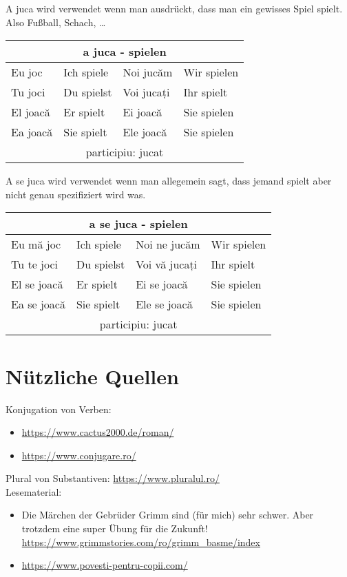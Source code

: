 \documentclass[11pt, oneside]{article}
\begin{document}
%
A juca wird verwendet wenn man ausdrückt, dass man ein gewisses Spiel spielt. Also Fußball, Schach, \dots
{}
\begin{center}
  \begin{tabular}{ |p{3.25cm}|p{3.25cm}||p{3.25cm}|p{3.25cm}| }
      \hline
      \multicolumn{4}{|c|}{a juca - spielen} \\
      \hline
      \hline
      Eu joc & Ich spiele & Noi jucăm & Wir spielen\\
      \hline
      Tu joci & Du spielst & Voi jucați & Ihr spielt\\
      \hline
      El joacă & Er spielt & Ei joacă & Sie spielen\\ 
      Ea joacă & Sie spielt & Ele joacă & Sie spielen\\
      \hline
      \multicolumn{4}{|c|}{participiu: jucat} \\
      \hline
     \end{tabular}
\end{center}
%
A se juca wird verwendet wenn man allegemein sagt, dass jemand spielt aber nicht genau spezifiziert wird was.
\begin{center}
  \begin{tabular}{ |p{3.25cm}|p{3.25cm}||p{3.25cm}|p{3.25cm}| }
      \hline
      \multicolumn{4}{|c|}{a se juca - spielen} \\
      \hline
      \hline
      Eu mă joc & Ich spiele & Noi ne jucăm & Wir spielen\\
      \hline
      Tu te joci & Du spielst & Voi vă jucați & Ihr spielt\\
      \hline
      El se joacă & Er spielt & Ei se joacă & Sie spielen\\ 
      Ea se joacă & Sie spielt & Ele se joacă & Sie spielen\\
      \hline
      \multicolumn{4}{|c|}{participiu: jucat} \\
      \hline
     \end{tabular}
\end{center}
% 
%
%
%
%
\pagebreak
\section{Nützliche Quellen}
Konjugation von Verben: 
\begin{itemize}
    \item \url{https://www.cactus2000.de/roman/}\\
    \item \url{https://www.conjugare.ro/}\\
\end{itemize}
Plural von Substantiven: \url{https://www.pluralul.ro/}\\
\newline
Lesematerial:
\begin{itemize}
  \item Die Märchen der Gebrüder Grimm sind (für mich) sehr schwer. Aber trotzdem eine super Übung für die Zukunft! \url{https://www.grimmstories.com/ro/grimm_basme/index}
  \item \url{https://www.povesti-pentru-copii.com/} 
\end{itemize}

%
\newpage
\printindex
%
\end{document}
